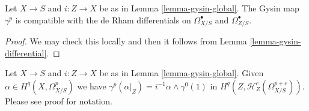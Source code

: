 \begin{lemma}
\label{lemma-gysin-differential-global}
Let $X \to S$ and $i : Z \to X$ be as in Lemma \ref{lemma-gysin-global}.
The Gysin map $\gamma^p$ is compatible with the de Rham
differentials on $\Omega^\bullet_{X/S}$ and $\Omega^\bullet_{Z/S}$.
\end{lemma}

\begin{proof}
We may check this locally and then it follows from
Lemma \ref{lemma-gysin-differential}.
\end{proof}

\begin{lemma}
\label{lemma-gysin-projection}
Let $X \to S$ and $i : Z \to X$ be as in Lemma \ref{lemma-gysin-global}.
Given $\alpha \in H^q(X, \Omega^p_{X/S})$ we have
$\gamma^p(\alpha|_Z) = i^{-1}\alpha \wedge \gamma^0(1)$ in
$H^q(Z, \mathcal{H}^c_Z(\Omega^{p + c}_{X/S}))$.
Please see proof for notation.
\end{lemma}

